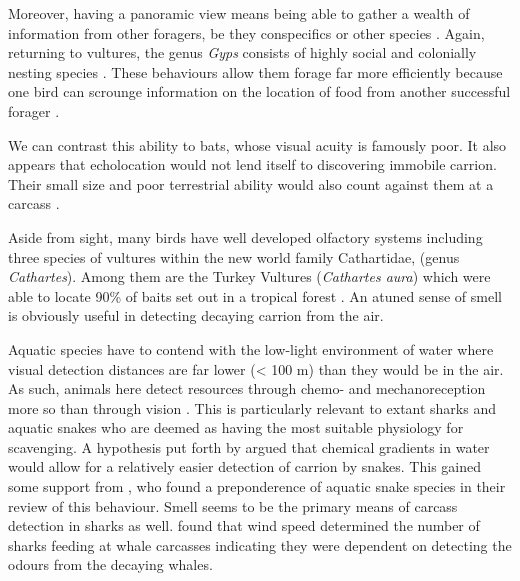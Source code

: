 \documentclass[a4paper,12pt]{article}
\begin{document}
Moreover, having a panoramic view means being able to gather a wealth of information from other foragers, be they conspecifics or other species \citep{jackson2008effect}.
Again, returning to vultures, the genus \textit{Gyps} consists of highly social and colonially nesting species \citep{fernandez2015density}.
These behaviours allow them forage far more efficiently because one bird can scrounge information on the location of food from another successful forager \citep{KaneVul}.

We can contrast this ability to bats, whose visual acuity is famously poor. 
It also appears that echolocation would not lend itself to discovering immobile carrion.
Their small size and poor terrestrial ability would also count against them at a carcass \citep{riskin2006terrestrial}.

Aside from sight, many birds have well developed olfactory systems \citep{AR:AR22815} including three species of vultures within the new world family Cathartidae, (genus \textit{Cathartes}).
Among them are the Turkey Vultures (\textit{Cathartes aura}) which were able to locate 90\% of baits set out in a tropical forest \citep{houston1986olfaction}. An atuned sense of smell is obviously useful in detecting decaying carrion from the air.




Aquatic species have to contend with the low-light environment of water where visual detection distances are far lower (< 100 m) than they would be in the air.
As such, animals here detect resources through chemo- and mechanoreception more so than through vision \citep{ruxton2004energetic}.
This is particularly relevant to extant sharks and aquatic snakes who are deemed as having the most suitable physiology for scavenging.
A hypothesis put forth by \cite{sazima1990necrofagia} argued that chemical gradients in water would allow for a relatively easier detection of carrion by snakes.
This gained some support from \cite{devault2002scavenging}, who found a preponderence of aquatic snake species in their review of this behaviour.
Smell seems to be the primary means of carcass detection in sharks as well. 
\cite{fallows2013white} found that wind speed determined the number of sharks feeding at whale carcasses indicating they were dependent on detecting the odours from the decaying whales. 
\end{document}
